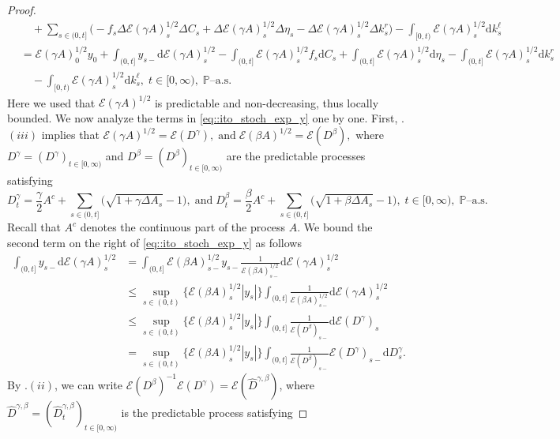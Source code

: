 \documentclass[10pt]{article} %
\newcommand\cE{\mathcal E}
\def \P{\mathbb{P}}
\def\d{\mathrm{d}}
\begin{document}
\begin{proof}
\begin{align}
		&\quad +\sum_{s \in (0,t]} \Big(-f_s\Delta \cE(\gamma A)^{1/2}_s \Delta C_s + \Delta \cE(\gamma A)^{1/2}_s \Delta \eta_s - \Delta \cE(\gamma A)^{1/2}_s \Delta k^r_s\Big) \nonumber - \int_{[0,t)} \cE(\gamma A)^{1/2}_s \d k^\ell_s \nonumber\\
		&= \cE(\gamma A)^{1/2}_0 y_0 + \int_{(0,t]}y_{s-}\d\cE(\gamma A)^{1/2}_s - \int_{(0,t]} \cE(\gamma A)^{1/2}_s f_s \d C_s + \int_{(0,t]} \cE(\gamma A)^{1/2}_s\d \eta_s - \int_{(0,t]} \cE(\gamma A)^{1/2}_s\d k^r_s \nonumber\\
		&\quad - \int_{[0,t)} \cE(\gamma A)^{1/2}_s \d k^\ell_s, \; t \in [0,\infty), \; \text{$\P$--a.s.} 
	\end{align}
	Here we used that $\cE(\gamma A)^{1/2}$ is predictable and non-decreasing, thus locally bounded. We now analyze the terms in \eqref{eq::ito_stoch_exp_y} one by one. First, .$(iii)$ implies that $\cE(\gamma A)^{1/2} = \cE(D^\gamma), \; \text{and} \; \cE(\beta A)^{1/2} = \cE(D^\beta),$ where $D^\gamma = (D^\gamma)_{t \in [0,\infty)}$ and $D^\beta = (D^\beta)_{t \in [0,\infty)}$ are the predictable processes satisfying
	\begin{equation*}
		D^\gamma_t = \frac{\gamma}{2} A^c + \sum_{s \in (0,t]} \big(\sqrt{1+\gamma\Delta A_s}-1\big), \; \text{and} \; D^\beta_t = \frac{\beta}{2} A^c + \sum_{s \in (0,t]} \big(\sqrt{1+\beta\Delta A_s}-1\big), \; t \in [0,\infty), \; \text{$\P$--a.s.}
	\end{equation*}
	Recall that $A^c$ denotes the continuous part of the process $A$. We bound the second term on the right of \eqref{eq::ito_stoch_exp_y} as follows
	\begin{align}\label{eq::sup_stoch_exp_inverse}
		\int_{(0,t]}y_{s-}\d\cE(\gamma A)^{1/2}_s 
		&= \int_{(0,t]}\cE(\beta A)^{1/2}_{s-}y_{s-}\frac{1}{\cE(\beta A)^{1/2}_{s-}}\d\cE(\gamma A)^{1/2}_s \nonumber\\
		&\leq \sup_{s \in (0,t)}\big\{\cE(\beta A)^{1/2}_{s}|y_{s}|\big\}\int_{(0,t]}\frac{1}{\cE(\beta A)^{1/2}_{s-}}\d\cE(\gamma A)^{1/2}_s \nonumber\\
		&\leq \sup_{s \in (0,t)}\big\{\cE(\beta A)^{1/2}_{s}|y_{s}|\big\}\int_{(0,t]}\frac{1}{\cE(D^\beta)_{s-}}\d\cE(D^\gamma)_s \nonumber\\
		&= \sup_{s \in (0,t)}\big\{\cE(\beta A)^{1/2}_{s}|y_{s}|\big\}\int_{(0,t]}\frac{1}{\cE(D^\beta)_{s-}}\cE(D^\gamma)_{s-}\d D^\gamma_s.
	\end{align}
	By .$(ii)$, we can write $\cE(D^\beta)^{-1}\cE(D^\gamma) = \cE(\widehat D^{\gamma,\beta})$, where $\widehat D^{\gamma,\beta} = (\widehat D^{\gamma,\beta}_t)_{t \in [0,\infty)}$ is the predictable process satisfying

\end{proof}
\end{document}
